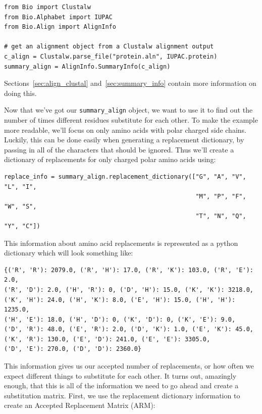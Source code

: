 \documentclass{report}
\begin{document}
\begin{verbatim}
from Bio import Clustalw
from Bio.Alphabet import IUPAC
from Bio.Align import AlignInfo

# get an alignment object from a Clustalw alignment output
c_align = Clustalw.parse_file("protein.aln", IUPAC.protein)
summary_align = AlignInfo.SummaryInfo(c_align)
\end{verbatim}

Sections~\ref{sec:align_clustal} and~\ref{sec:summary_info} contain
more information on doing this.

Now that we've got our \verb|summary_align| object, we want to use it
to find out the number of times different residues substitute for each
other. To make the example more readable, we'll focus on only amino
acids with polar charged side chains. Luckily, this can be done easily
when generating a replacement dictionary, by passing in all of the
characters that should be ignored. Thus we'll create a dictionary of
replacements for only charged polar amino acids using:

\begin{verbatim}
replace_info = summary_align.replacement_dictionary(["G", "A", "V", "L", "I",
                                                     "M", "P", "F", "W", "S",
                                                     "T", "N", "Q", "Y", "C"])
\end{verbatim}

This information about amino acid replacements is represented as a
python dictionary which will look something like:

\begin{verbatim}
{('R', 'R'): 2079.0, ('R', 'H'): 17.0, ('R', 'K'): 103.0, ('R', 'E'): 2.0,
('R', 'D'): 2.0, ('H', 'R'): 0, ('D', 'H'): 15.0, ('K', 'K'): 3218.0,
('K', 'H'): 24.0, ('H', 'K'): 8.0, ('E', 'H'): 15.0, ('H', 'H'): 1235.0,
('H', 'E'): 18.0, ('H', 'D'): 0, ('K', 'D'): 0, ('K', 'E'): 9.0,
('D', 'R'): 48.0, ('E', 'R'): 2.0, ('D', 'K'): 1.0, ('E', 'K'): 45.0,
('K', 'R'): 130.0, ('E', 'D'): 241.0, ('E', 'E'): 3305.0,
('D', 'E'): 270.0, ('D', 'D'): 2360.0}
\end{verbatim}

This information gives us our accepted number of replacements, or how
often we expect different things to substitute for each other. It
turns out, amazingly enough, that this is all of the information we
need to go ahead and create a substitution matrix. First, we use the
replacement dictionary information to create an Accepted Replacement
Matrix (ARM):
\end{document}
